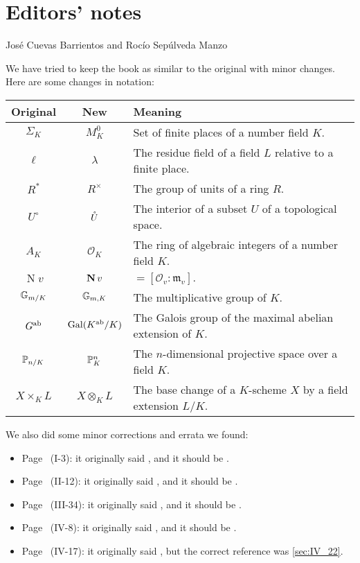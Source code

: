 \chapter*{Editors' notes}

\begin{center}
José Cuevas Barrientos and Rocío Sepúlveda Manzo
\end{center}

We have tried to keep the book as similar to the original with minor changes.
Here are some changes in notation:
\begin{longtable}{|c|c|p{9cm}|}
	\hline
	\textbf{Original} & \textbf{New} & \textbf{Meaning} \\
	\hline
	\endhead

	\hline
	\endfoot

	$\Sigma_K$ & $M_K^0$ & Set of finite places of a number field $K$. \\
	$\ell$ & $\lambda$ & The residue field of a field $L$ relative to a finite place. \\
	$R^*$ & $R^\times$ & The group of units of a ring $R$. \\
	$U^\circ$ & $\mathring{U}$ & The interior of a subset $U$ of a topological space. \\
	$A_K$ & $\mathcal{O}_K$ & The ring of algebraic integers of a number field $K$. \\
	$\operatorname{N} v$ & $\operatorname{\mathbf{N}} v$ & ${} = [\mathcal{O}_v : \mathfrak{m}_v].$ \\
	$\mathbb{G}_{m/K}$ & $\mathbb{G}_{m, K}$ & The multiplicative group of $K$. \\
	$G^{\mathrm{ab}}$ & $\operatorname{Gal}(K^{\mathrm{ab}}/K)$ & The Galois group of the maximal abelian extension of $K$. \\
	$\mathbb{P}_{n/K}$ & $\mathbb{P}^n_K$ & The $n$-dimensional projective space over a field $K$. \\
	$X \times_K L$ & $X \otimes_K L$ & The base change of a $K$-scheme $X$ by a field extension $L/K$. \\
\end{longtable}

We also did some minor corrections and errata we found:
\begin{itemize}
\item Page~\pageref{errata:t't} (I-3):
	it originally said , and it should be
	.
\item Page~\pageref{errata:follows_from_c} (II-12):
	it originally said , and it
	should be .
\item Page~\pageref{errata:An+k} (III-34):
	it originally said , and it should be
	.
\item Page~\pageref{errata:uv12} (IV-8):
	it originally said , and it
	should be .
\item Page~\pageref{errata:wrongsec} (IV-17):
	it originally said , but the
	correct reference was \ref{sec:IV_22}.
\end{itemize}
